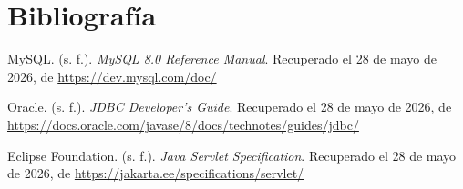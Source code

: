 \documentclass[12pt,letterpaper]{article}
\begin{document}
\newpage
\section*{Bibliografía}

MySQL. (s. f.). \textit{MySQL 8.0 Reference Manual}. Recuperado el 28 de mayo de 2026, de \url{https://dev.mysql.com/doc/}

Oracle. (s. f.). \textit{JDBC Developer's Guide}. Recuperado el 28 de mayo de 2026, de \url{https://docs.oracle.com/javase/8/docs/technotes/guides/jdbc/}

Eclipse Foundation. (s. f.). \textit{Java Servlet Specification}. Recuperado el 28 de mayo de 2026, de \url{https://jakarta.ee/specifications/servlet/}
\end{document}
